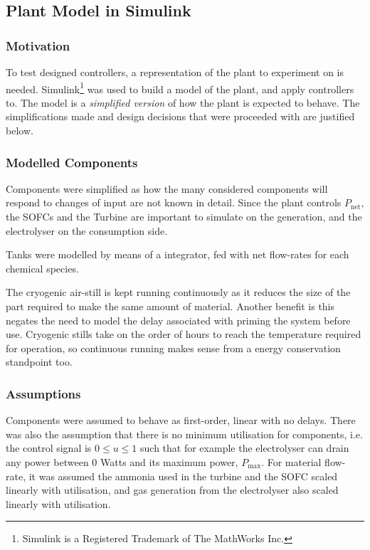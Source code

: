 \subsection{Plant Model in Simulink\textregistered}
\label{sec:plant}

\subsubsection{Motivation}
To test designed controllers, a representation of the plant to experiment on is needed.
Simulink\footnote{Simulink is a Registered Trademark of The MathWorks Inc.} was used to build a model of the plant, and apply controllers to.
The model is a \emph{simplified version} of how the plant is expected to behave.
The simplifications made and design decisions that were proceeded with are justified below.

\subsubsection{Modelled Components}

Components were simplified as how the many considered components will respond to changes of input are not known in detail.
Since the plant controls $P_{\text{net}}$, the SOFCs and the Turbine are important to simulate on the generation, and the electrolyser on the consumption side.

Tanks were modelled by means of a integrator, fed with net flow-rates for each chemical species.

The cryogenic air-still is kept running continuously as it reduces the size of the part required to make the same amount of material.
Another benefit is this negates the need to model the delay associated with priming the system before use.
Cryogenic stills take on the order of hours to reach the temperature required for operation, so continuous running makes sense from a energy conservation standpoint too.

\subsubsection{Assumptions}

Components were assumed to behave as first-order, linear with no delays.
There was also the assumption that there is no minimum utilisation for components, i.e. the control signal is $0 \leq u \leq 1$ such that for example the electrolyser can drain any power between $0$ Watts and its maximum power, $P_{\text{max}}$.
For material flow-rate, it was assumed the ammonia used in the turbine and the SOFC scaled linearly with utilisation, and gas generation from the electrolyser also scaled linearly with utilisation.

